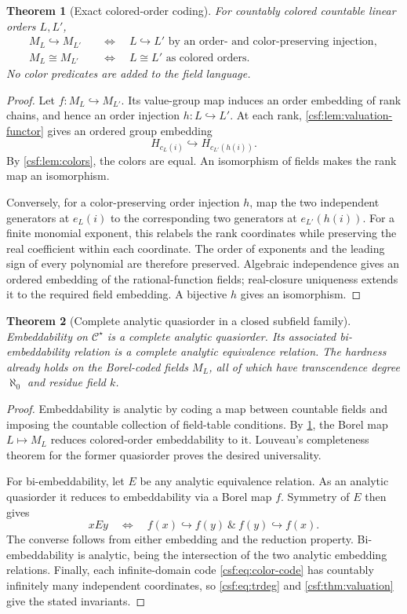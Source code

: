 \documentclass[11pt,a4paper]{article}
\numberwithin{equation}{section}
\newtheorem{theorem}{Theorem}[section]
\theoremstyle{definition}
\theoremstyle{remark}
\newcommand{\emb}{\hookrightarrow}
\newcommand{\Cstar}{\mathcal C^{\star}}
\begin{document}
\begin{theorem}[Exact colored-order coding]
\label{csf:thm:colored-coding}
For countably colored countable linear orders $L,L'$,
\begin{align*}
 M_L\emb M_{L'}
 &\quad\Longleftrightarrow\quad
 L\emb L'\text{ by an order- and color-preserving injection},\\
 M_L\cong M_{L'}
 &\quad\Longleftrightarrow\quad
 L\cong L'\text{ as colored orders}.
\end{align*}
No color predicates are added to the field language.
\end{theorem}
\begin{proof}
Let $f:M_L\emb M_{L'}$. Its value-group map induces an order embedding
of rank chains, and hence an order injection $h:L\emb L'$. At each rank,
\cref{csf:lem:valuation-functor} gives an ordered group embedding
\[
 H_{c_L(i)}\emb H_{c_{L'}(h(i))}.
\]
By \cref{csf:lem:colors}, the colors are equal. An isomorphism of fields makes
the rank map an isomorphism.

Conversely, for a color-preserving order injection $h$, map the two
independent generators at $e_L(i)$ to the corresponding two generators
at $e_{L'}(h(i))$. For a finite monomial exponent, this relabels the rank
coordinates while preserving the real coefficient within each coordinate.
The order of exponents and the leading sign of every polynomial are
therefore preserved. Algebraic independence gives an ordered embedding of
the rational-function fields; real-closure uniqueness extends it to the
required field embedding. A bijective $h$ gives an isomorphism.
\end{proof}

\begin{theorem}[Complete analytic quasiorder in a closed subfield family]
\label{csf:thm:universality}
Embeddability on $\Cstar$ is a complete analytic quasiorder. Its associated
bi-embeddability relation is a complete analytic equivalence relation.
The hardness already holds on the Borel-coded fields $M_L$, all of which
have transcendence degree $\aleph_0$ and residue field $k$.
\end{theorem}
\begin{proof}
Embeddability is analytic by coding a map between countable fields and
imposing the countable collection of field-table conditions. By
\cref{csf:thm:colored-coding}, the Borel map $L\mapsto M_L$ reduces colored-order
embeddability to it. Louveau's completeness theorem for the former
quasiorder \cite{marcone,cmms} proves the desired universality.

For bi-embeddability, let $E$ be any analytic equivalence relation. As an
analytic quasiorder it reduces to embeddability via a Borel map $f$.
Symmetry of $E$ then gives
\[
 xEy\quad\Longleftrightarrow\quad f(x)\emb f(y)\ \&\ f(y)\emb f(x).
\]
The converse follows from either embedding and the reduction property.
Bi-embeddability is analytic, being the intersection of the two analytic
embedding relations. Finally, each infinite-domain code
\eqref{csf:eq:color-code} has countably infinitely many independent
coordinates, so \eqref{csf:eq:trdeg} and \cref{csf:thm:valuation} give the stated
invariants.
\end{proof}
\end{document}
